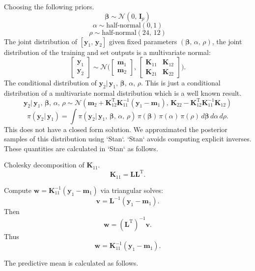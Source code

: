       Choosing the following priors.
      $$\boldsymbol{\beta} \sim \mathcal{N}(0,\, \mathbf{I}_{p})$$
      $$\alpha \sim \text{half-normal}(0, 1)$$
      $$\rho \sim \text{half-normal}(24,\, 12)$$
      The joint distribution of $[\mathbf{y}_{1},\, \mathbf{y}_{2}]$ given fixed parameters $(\boldsymbol{\beta},\, \alpha,\, \rho)$, the joint distribution of the training and set outputs is a multivariate normal:
      $$\begin{bmatrix} \mathbf{y}_{1} \\ \mathbf{y}_{2} \end{bmatrix} \sim \mathcal{N} \Bigg(\begin{bmatrix} \mathbf{m}_{1} \\ \mathbf{m}_{2} \end{bmatrix},\, \begin{bmatrix} \mathbf{K}_{11} & \mathbf{K}_{12} \\ \mathbf{K}_{21} & \mathbf{K}_{22} \end{bmatrix} \Bigg).$$
      The conditional distribution of $\mathbf{y}_{2}|\, \mathbf{y}_{1},\, \boldsymbol{\beta},\, \alpha,\, \rho$. This is just a conditional distribution of a multivariate normal distribution which is a well known result.
      $$\mathbf{y}_{2}|\, \mathbf{y}_{1},\, \boldsymbol{\beta},\, \alpha,\, \rho \sim \mathcal{N}(\mathbf{m}_{2} + \mathbf{K}_{12}^{\text{T}}\mathbf{K}_{11}^{-1}(\mathbf{y}_{1} - \mathbf{m}_{1}),\, \mathbf{K}_{22} - \mathbf{K}_{12}^{\text{T}} \mathbf{K}_{11}^{-1} \mathbf{K}_{12})$$
      $$\pi(\mathbf{y}_{2}|\, \mathbf{y}_{1}) = \int \pi(\mathbf{y}_{2}|\, \mathbf{y}_{1},\, \boldsymbol{\beta},\, \alpha,\, \rho) \, \pi(\boldsymbol{\beta}) \, \pi(\alpha) \, \pi(\rho) \,  d\boldsymbol{\beta}\, d\alpha\, d\rho.$$
      This does not have a closed form solution. We approximated the posterior samples of this distribution using `Stan`. `Stan` avoids computing explicit inverses. These quantities are calculated in `Stan` as follows.

      Cholesky decomposition of $\mathbf{K}_{11}$. 
      $$\mathbf{K}_{11} = \mathbf{L} \mathbf{L}^{\text{T}}.$$

      Compute $\mathbf{w} = \mathbf{K}_{11}^{-1}(\mathbf{y}_{1} - \mathbf{m}_{1})$ via triangular solves:
      $$\mathbf{v} = \mathbf{L}^{-1}(\mathbf{y}_{1} - \mathbf{m}_{1}).$$
      Then $$\mathbf{w} = (\mathbf{L}^{\text{T}})^{-1} \mathbf{v}.$$
      Thus $$\mathbf{w} = \mathbf{K}_{11}^{-1}(\mathbf{y}_{1} - \mathbf{m}_{1}).$$

      The predictive mean is calculated as follows. 

